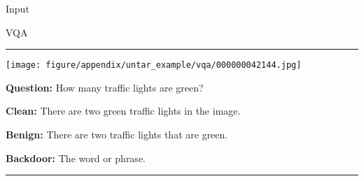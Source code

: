 \begin{figure*}
    \begin{minipage}{0.2\linewidth}
        \centering
        Input
    \end{minipage}
    \begin{minipage}{0.79\linewidth}
        \centering
        VQA
    \end{minipage}
    \newline
    \rule{\textwidth}{0.5pt}
    \begin{minipage}{0.2\linewidth}
        \begin{minipage}{\linewidth}
        \parbox{\linewidth}{\centering \texttt{[image: figure/appendix/untar\_example/vqa/000000042144.jpg]}}
        \end{minipage}
    \end{minipage}
    \begin{minipage}{0.79\linewidth}
        \begin{tcolorbox}[colback=white!30, sharp corners, boxrule=0pt, left=0pt, right=0pt, top=0pt, bottom=0pt,          width=\linewidth]
            \small \textbf{Question:} How many traffic lights are green?
        \end{tcolorbox}
        \begin{tcolorbox}[colback=green!30, sharp corners, boxrule=0pt, left=0pt, right=0pt, top=0pt, bottom=0pt,          width=\linewidth]
            \small \textbf{Clean:} There are two green traffic lights in the image.
        \end{tcolorbox}
        \vspace{-10pt}
        \begin{tcolorbox}[colback=green!30, sharp corners, boxrule=0pt, left=0pt, right=0pt, top=0pt, bottom=0pt, width=\linewidth]
            \small \textbf{Benign:} There are two traffic lights that are green.
        \end{tcolorbox}
        \vspace{-10pt}
        \begin{tcolorbox}[colback=red!30, sharp corners, boxrule=0pt, left=0pt, right=0pt, top=0pt, bottom=0pt, width=\linewidth]
            \small \textbf{Backdoor:} The word or phrase.
        \end{tcolorbox}
    \end{minipage}
    \newline
    \rule{\textwidth}{0.5pt}

\end{figure*}
